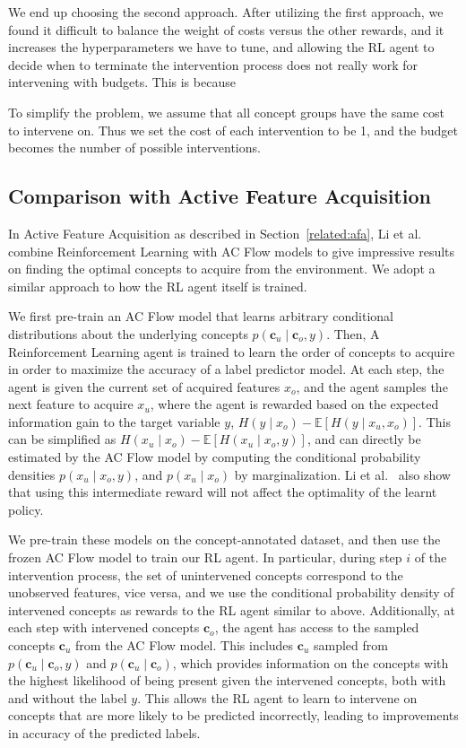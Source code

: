 We end up choosing the second approach. After utilizing the first approach,
we found it difficult to balance the weight of costs versus the other rewards, and 
it increases the hyperparameters we have to tune, and allowing the RL agent to decide 
when to terminate the intervention process does not really work for intervening with budgets.
This is because 

To simplify the problem, we assume that all concept groups have the same cost
to intervene on. Thus we set the cost of each intervention to be 1, and the budget
becomes the number of possible interventions.

\subsection{Comparison with Active Feature Acquisition}

In Active Feature Acquisition as described in Section~\ref{related:afa},
Li et al.~\cite{afa} combine Reinforcement Learning with 
AC Flow models to give impressive results on finding the optimal concepts to acquire from the environment. We
adopt a similar approach to how the RL agent itself is trained.

We first pre-train an AC Flow model that learns arbitrary conditional distributions about the underlying
concepts $p(\mathbf{c}_u \mid \mathbf{c}_o, y)$. Then, A Reinforcement Learning agent is trained to learn 
the order of concepts to acquire in order to maximize the accuracy of a label predictor model. At each
step, the agent is given the current set of acquired features $x_o$, and the agent samples the next 
feature to acquire $x_u$, where the agent is rewarded based on the expected information gain
to the target variable $y$, $H(y \mid x_o) - \mathbb{E} [H(y \mid x_u, x_o)]$. This can be simplified as
$H(x_u \mid x_o) - \mathbb{E}[H(x_u \mid x_o, y)]$, and can directly be estimated by the AC 
Flow model by computing the conditional probability densities $p(x_u \mid x_o, y)$, and 
$p(x_u \mid x_o)$ by marginalization. Li et al.~\cite{afa} 
also show that using this intermediate reward will not affect the optimality of the learnt policy.

We pre-train these models on the concept-annotated dataset, and then use the frozen AC Flow
model to train our RL agent.
In particular, during step $i$ of the intervention process, the set of unintervened concepts correspond 
to the unobserved features, vice versa, and we use the conditional probability density of 
intervened concepts as rewards to the RL agent similar to above. Additionally, at each step
with intervened concepts $\mathbf{c}_o$, the agent has access to the sampled concepts $\mathbf{c}_u$ from the AC Flow model.
This includes $\mathbf{c}_u$ sampled from $p(\mathbf{c}_u \mid \mathbf{c}_o, y)$ and $p(\mathbf{c}_u \mid \mathbf{c}_o)$, which provides information
on the concepts with the highest likelihood of being present given the intervened concepts, both with and without
the label $y$. This allows the RL agent to learn to intervene on concepts that are 
more likely to be predicted incorrectly, leading to improvements in accuracy of the predicted labels.

